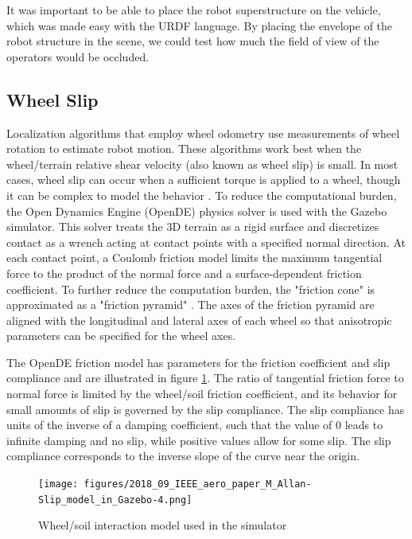 \documentclass[twocolumn,letterpaper]{IEEEAerospaceCLS}  %
\begin{document}
It was important to be able to place the robot superstructure on the vehicle, which was made easy with the URDF language.  By placing the envelope of the robot structure in the scene, we could test how much the field of view of the operators would be occluded.  

\subsection{Wheel Slip}
Localization algorithms that employ wheel odometry use measurements of wheel rotation to estimate robot motion.
These algorithms work best when the wheel/terrain relative shear velocity (also known as wheel slip) is small.
In most cases, wheel slip can occur when a sufficient torque is applied to a wheel,
though it can be complex to model the behavior \cite{yoshida1013712}.
To reduce the computational burden, the Open Dynamics Engine (OpenDE) physics solver is used with the Gazebo simulator.
This solver treats the 3D terrain as a rigid surface and discretizes contact as a wrench
acting at contact points with a specified normal direction.
At each contact point, a Coulomb friction model limits the maximum tangential force
to the product of the normal force and a surface-dependent friction coefficient.
To further reduce the computation burden, the "friction cone" is approximated
as a "friction pyramid" \cite{hsuPeters2014}.
The axes of the friction pyramid are aligned with the longitudinal and lateral axes of each wheel
so that anisotropic parameters can be specified for the wheel axes.

The OpenDE friction model has parameters for the friction coefficient and slip compliance
and are illustrated in figure \ref{fig:wheelsoilmodel}.
The ratio of tangential friction force to normal force is limited by the wheel/soil friction coefficient,
and its behavior for small amounts of slip is governed by the slip compliance.
The slip compliance has units of the inverse of a damping coefficient,
such that the value of 0 leads to infinite damping and no slip,
while positive values allow for some slip.
The slip compliance corresponds to the inverse slope of the curve near the origin.

\begin{figure}[h!]
    \texttt{[image: figures/2018\_09\_IEEE\_aero\_paper\_M\_Allan-Slip\_model\_in\_Gazebo-4.png]}
    \caption{Wheel/soil interaction model used in the simulator}
    \label{fig:wheelsoilmodel}
\end{figure}
\end{document}
